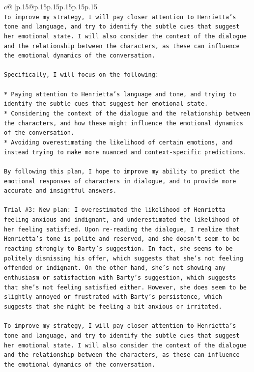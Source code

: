 \documentclass{article}
\begin{document}
{\begin{supertabular}{c@{$\;$}|p{.15\linewidth}@{}p{.15\linewidth}p{.15\linewidth}p{.15\linewidth}p{.15\linewidth}p{.15\linewidth}}
{{{\\ 
\texttt{To improve my strategy, I will pay closer attention to Henrietta's tone and language, and try to identify the subtle cues that suggest her emotional state. I will also consider the context of the dialogue and the relationship between the characters, as these can influence the emotional dynamics of the conversation. } \\
\\ 
\texttt{Specifically, I will focus on the following:} \\
\\ 
\texttt{* Paying attention to Henrietta's language and tone, and trying to identify the subtle cues that suggest her emotional state.} \\
\texttt{* Considering the context of the dialogue and the relationship between the characters, and how these might influence the emotional dynamics of the conversation.} \\
\texttt{* Avoiding overestimating the likelihood of certain emotions, and instead trying to make more nuanced and context{-}specific predictions.} \\
\\ 
\texttt{By following this plan, I hope to improve my ability to predict the emotional responses of characters in dialogue, and to provide more accurate and insightful answers.} \\
\\ 
\texttt{Trial \#3: New plan: I overestimated the likelihood of Henrietta feeling anxious and indignant, and underestimated the likelihood of her feeling satisfied. Upon re{-}reading the dialogue, I realize that Henrietta's tone is polite and reserved, and she doesn't seem to be reacting strongly to Barty's suggestion. In fact, she seems to be politely dismissing his offer, which suggests that she's not feeling offended or indignant. On the other hand, she's not showing any enthusiasm or satisfaction with Barty's suggestion, which suggests that she's not feeling satisfied either. However, she does seem to be slightly annoyed or frustrated with Barty's persistence, which suggests that she might be feeling a bit anxious or irritated. } \\
\\ 
\texttt{To improve my strategy, I will pay closer attention to Henrietta's tone and language, and try to identify the subtle cues that suggest her emotional state. I will also consider the context of the dialogue and the relationship between the characters, as these can influence the emotional dynamics of the conversation. } \\
}}}
\end{supertabular}}
\end{document}
